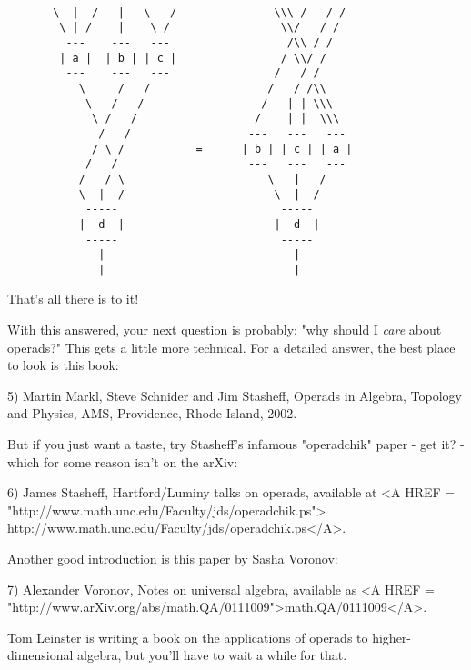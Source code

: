 \begin{verbatim}

       \  |  /   |   \   /               \\\ /   / /
        \ | /    |    \ /                 \\/   / /
         ---    ---   ---                  /\\ / /
        | a |  | b | | c |                / \\/ /
         ---    ---   ---                /   / /
           \     /   /                  /   / /\\
            \   /   /                  /   | | \\\  
             \ /   /                  /    | |  \\\
              /   /                  ---   ---   ---
             / \ /           =      | b | | c | | a |
            /   /                    ---   ---   ---
           /   / \                      \   |   /
           \  |  /                       \  |  /
            -----                         -----
           |  d  |                       |  d  | 
            -----                         -----
              |                             |
              |                             |
\end{verbatim}
    
That's all there is to it!

With this answered, your next question is probably: "why should
I \emph{care} about operads?" This gets a little more technical.
For a detailed answer, the best place to look is this book:

5)  Martin Markl, Steve Schnider and Jim Stasheff, Operads in Algebra, 
Topology and Physics, AMS, Providence, Rhode Island, 2002. 

But if you just want a taste, try Stasheff's infamous "operadchik" paper -
get it? - which for some reason isn't on the arXiv:

6) James Stasheff, Hartford/Luminy talks on operads, available
at <A HREF = "http://www.math.unc.edu/Faculty/jds/operadchik.ps">  
http://www.math.unc.edu/Faculty/jds/operadchik.ps</A>.  

Another good introduction is this paper by Sasha Voronov:

7) Alexander Voronov, Notes on universal algebra, available as
<A HREF = "http://www.arXiv.org/abs/math.QA/0111009">math.QA/0111009</A>.

Tom Leinster is writing a book on the applications of operads to 
higher-dimensional algebra, but you'll have to wait a while for that.

